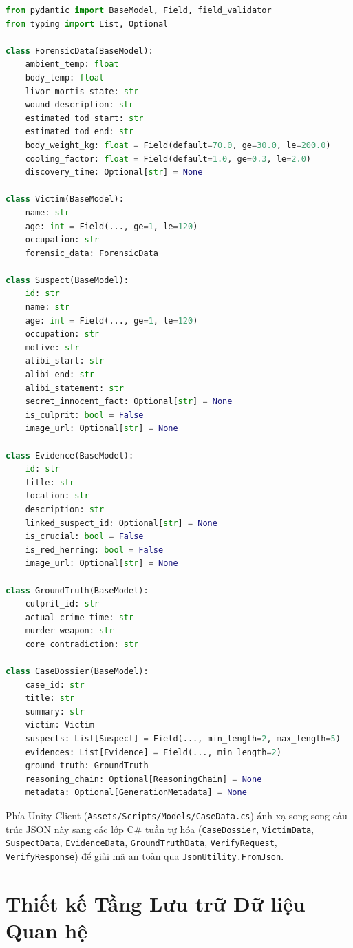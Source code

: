 \begin{lstlisting}[language=Python, caption={Trích đoạn Data Schema Thực thể trong \texttt{detective-backend/models.py}}]
from pydantic import BaseModel, Field, field_validator
from typing import List, Optional

class ForensicData(BaseModel):
    ambient_temp: float
    body_temp: float
    livor_mortis_state: str
    wound_description: str
    estimated_tod_start: str
    estimated_tod_end: str
    body_weight_kg: float = Field(default=70.0, ge=30.0, le=200.0)
    cooling_factor: float = Field(default=1.0, ge=0.3, le=2.0)
    discovery_time: Optional[str] = None

class Victim(BaseModel):
    name: str
    age: int = Field(..., ge=1, le=120)
    occupation: str
    forensic_data: ForensicData

class Suspect(BaseModel):
    id: str
    name: str
    age: int = Field(..., ge=1, le=120)
    occupation: str
    motive: str
    alibi_start: str
    alibi_end: str
    alibi_statement: str
    secret_innocent_fact: Optional[str] = None
    is_culprit: bool = False
    image_url: Optional[str] = None

class Evidence(BaseModel):
    id: str
    title: str
    location: str
    description: str
    linked_suspect_id: Optional[str] = None
    is_crucial: bool = False
    is_red_herring: bool = False
    image_url: Optional[str] = None

class GroundTruth(BaseModel):
    culprit_id: str
    actual_crime_time: str
    murder_weapon: str
    core_contradiction: str

class CaseDossier(BaseModel):
    case_id: str
    title: str
    summary: str
    victim: Victim
    suspects: List[Suspect] = Field(..., min_length=2, max_length=5)
    evidences: List[Evidence] = Field(..., min_length=2)
    ground_truth: GroundTruth
    reasoning_chain: Optional[ReasoningChain] = None
    metadata: Optional[GenerationMetadata] = None
\end{lstlisting}

Phía Unity Client (\texttt{Assets/Scripts/Models/CaseData.cs}) ánh xạ song song cấu trúc JSON này sang các lớp C\# tuần tự hóa (\texttt{CaseDossier}, \texttt{VictimData}, \texttt{SuspectData}, \texttt{EvidenceData}, \texttt{GroundTruthData}, \texttt{VerifyRequest}, \texttt{VerifyResponse}) để giải mã an toàn qua \texttt{JsonUtility.FromJson}.

\section{Thiết kế Tầng Lưu trữ Dữ liệu Quan hệ}
\label{sec:arch_database}

